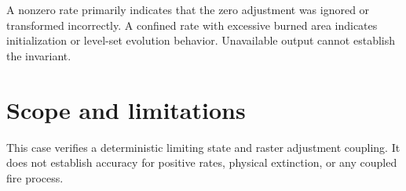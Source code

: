 A nonzero rate primarily indicates that the zero adjustment was ignored or transformed incorrectly. A confined rate with excessive burned area indicates initialization or level-set evolution behavior. Unavailable output cannot establish the invariant.

\section{Scope and limitations}

This case verifies a deterministic limiting state and raster adjustment coupling. It does not establish accuracy for positive rates, physical extinction, or any coupled fire process.

